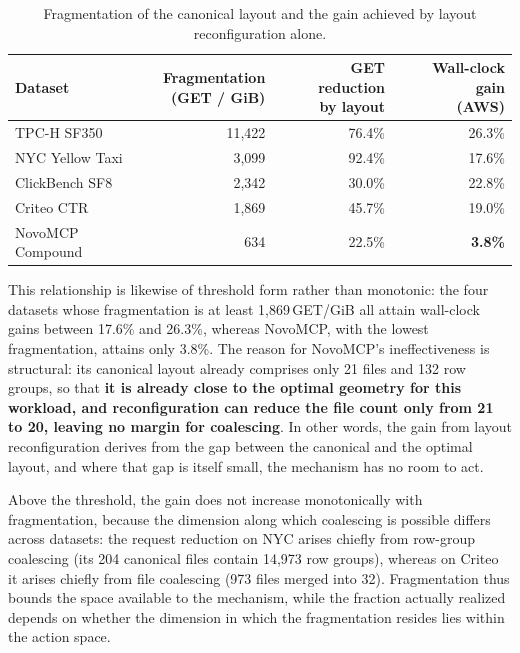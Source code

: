 \begin{table}[t]
\centering
\caption{Fragmentation of the canonical layout and the gain achieved by layout
reconfiguration alone.}
\label{tab:fragmentation}
\footnotesize
\setlength{\tabcolsep}{4pt}
\begin{tabular}{@{}lrrr@{}}
\toprule
Dataset & \makecell[r]{Fragmentation\\(GET / GiB)} &
\makecell[r]{GET reduction\\by layout} & \makecell[r]{Wall-clock gain\\(AWS)} \\
\midrule
TPC-H SF350      & 11{,}422 & 76.4\% & 26.3\% \\
NYC Yellow Taxi  & 3{,}099  & 92.4\% & 17.6\% \\
ClickBench SF8   & 2{,}342  & 30.0\% & 22.8\% \\
Criteo CTR       & 1{,}869  & 45.7\% & 19.0\% \\
NovoMCP Compound & 634      & 22.5\% & \textbf{3.8\%} \\
\bottomrule
\end{tabular}
\end{table}

This relationship is likewise of threshold form rather than monotonic: the four
datasets whose fragmentation is at least 1{,}869\,GET/GiB all attain wall-clock
gains between 17.6\% and 26.3\%, whereas NovoMCP, with the lowest
fragmentation, attains only 3.8\%. The reason for NovoMCP's ineffectiveness is
structural: its canonical layout already comprises only 21 files and 132 row
groups, so that \textbf{it is already close to the optimal geometry for this
workload, and reconfiguration can reduce the file count only from 21 to 20,
leaving no margin for coalescing}. In other words, the gain from layout
reconfiguration derives from the gap between the canonical and the optimal
layout, and where that gap is itself small, the mechanism has no room to act.

Above the threshold, the gain does not increase monotonically with
fragmentation, because the dimension along which coalescing is possible differs
across datasets: the request reduction on NYC arises chiefly from row-group
coalescing (its 204 canonical files contain 14{,}973 row groups), whereas on
Criteo it arises chiefly from file coalescing (973 files merged into 32).
Fragmentation thus bounds the space available to the mechanism, while the
fraction actually realized depends on whether the dimension in which the
fragmentation resides lies within the action space.

